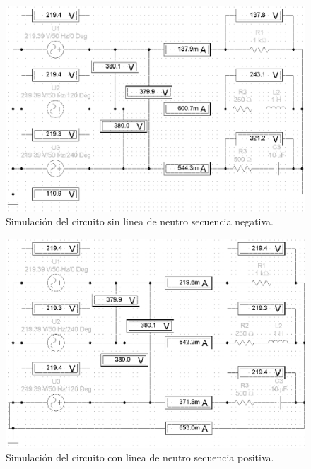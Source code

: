 \documentclass[letter,11pt]{article}
\begin{document}
\begin{figure}[!h]
\centering
\includegraphics[scale=0.99]{simulacion/practica3.2.eps}
\caption{Simulación del circuito sin linea de neutro secuencia negativa.}
\label{simulacion2}
\end{figure}

\begin{figure}[!h]
\centering
\includegraphics[scale=0.99]{simulacion/practica3.3.eps}
\caption{Simulación del circuito con linea de neutro secuencia positiva.}
\label{simulacion3}
\end{figure}
\end{document}
